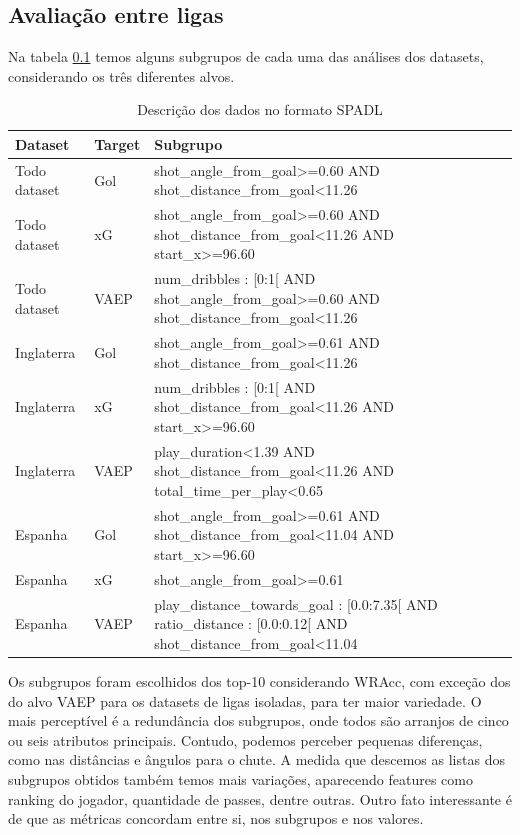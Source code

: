 \documentclass{article}
\begin{document}
\subsection{Avaliação entre ligas}

Na tabela \ref{} temos alguns subgrupos de cada uma das análises dos datasets, 
considerando os três diferentes alvos.

\begin{table}[H]
	\centering
	\label{tab:resultMetricas}
	\begin{tabular}{|l|l|l|l|l|}
		\hline
		\textbf{Dataset} & \textbf{Target} & 
		\textbf{Subgrupo}
		\\
		\hline
		Todo dataset & Gol & shot\_angle\_from\_goal>=0.60 AND shot\_distance\_from\_goal<11.26
		\\
		\hline
		Todo dataset & xG & shot\_angle\_from\_goal>=0.60 AND shot\_distance\_from\_goal<11.26 AND 
		start\_x>=96.60
		\\
		\hline
		Todo dataset & VAEP &  num\_dribbles : [0:1[ AND shot\_angle\_from\_goal>=0.60 AND 
		shot\_distance\_from\_goal<11.26
		\\
		\hline
		Inglaterra & Gol & shot\_angle\_from\_goal>=0.61 AND shot\_distance\_from\_goal<11.26
		\\
		\hline
		Inglaterra & xG & num\_dribbles : [0:1[ AND shot\_distance\_from\_goal<11.26 
		AND start\_x>=96.60
		\\
		\hline
		Inglaterra & VAEP & play\_duration<1.39 AND shot\_distance\_from\_goal<11.26 AND 
		total\_time\_per\_play<0.65
		\\
		\hline
		Espanha & Gol & shot\_angle\_from\_goal>=0.61 AND shot\_distance\_from\_goal<11.04 
		AND start\_x>=96.60 
		\\
		\hline
		Espanha & xG & shot\_angle\_from\_goal>=0.61
		\\
		\hline
		Espanha & VAEP & play\_distance\_towards\_goal : [0.0:7.35[ AND ratio\_distance : 
		[0.0:0.12[ AND shot\_distance\_from\_goal<11.04
		\\
		\hline
	\end{tabular}
	\caption{Descrição dos dados no formato SPADL}
\end{table}

Os subgrupos foram escolhidos dos top-10 considerando WRAcc, com exceção dos do alvo VAEP para os 
datasets de ligas isoladas, para ter maior variedade. O mais perceptível é a redundância dos subgrupos, 
onde todos são arranjos de cinco ou seis atributos principais. Contudo, podemos perceber pequenas 
diferenças, como nas distâncias e ângulos para o chute. A medida que descemos as listas dos subgrupos 
obtidos também temos mais variações, aparecendo features como ranking do jogador, quantidade de passes, 
dentre outras. Outro fato interessante é de que as métricas concordam entre si, nos subgrupos e nos valores.
\end{document}
